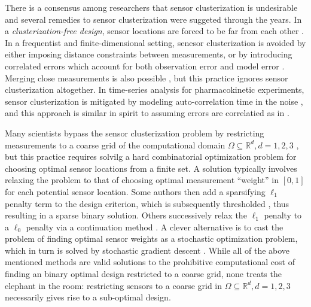There is a consensus among researchers that sensor clusterization is
undesirable \cite{fedorov1996, hooker2009, fedorov2012, Ucinski05,
  neitzel2019sparse} and several remedies to sensor clusterization
were suggeted through the years. In a \emph{clusterization-free
design}, sensor locations are forced to be far from each other
\cite{Ucinski05}. In a frequentist and finite-dimensional setting,
senesor clusterization is avoided by either imposing distance
constraints between measurements, or by introducing correlated errors
which account for both observation error and model error
\cite{Ucinski05}. Merging close measurements is also possible
\cite{fedorov2012}, but this practice ignores sensor clusterization
altogether. In time-series analysis for pharmacokinetic experiments,
sensor clusterization is mitigated by modeling auto-correlation time
in the noise \cite{hooker2009}, and this approach is similar in spirit
to assuming errors are correlatied as in \cite{Ucinski05}.


Many scientists bypass the sensor clusterization problem by
restricting measurements to a coarse grid of the computational domain
$\Omega \subseteq \mathbb{R}^d, d=1,2,3$ \cite{koval2020,
  alexanderian2021, attia2020, alexanderian2014sparsification,
  AlexanderianPetraStadlerEtAl16, alexanderian2018efficient}, but this
practice requires solvilg a hard combinatorial optimization problem
for choosing optimal sensor locations from a finite set. A solution
typically involves relaxing the problem to that of choosing optimal
measurement ``weight'' in $[0,1]$ for each potential sensor
location. Some authors then add a sparsifying $\ell_1$ penalty term to
the design criterion, which is subsequently thresholded
\cite{horesh2008borehole}, thus resulting in a sparse binary
solution. Others successively relax the $\ell_1$ penalty to a $\ell_0$
penalty via a continuation method
\cite{AlexanderianPetraStadlerEtAl16,
  alexanderian2014sparsification}. A clever alternative is to cast the
problem of finding optimal sensor weights as a stochastic optimization
problem, which in turn is solved by stochastic gradient descent
\cite{attia2022stochastic}. While all of the above mentioned methods
are valid solutions to the prohibitive computational cost of finding
an binary optimal design restricted to a coarse grid, none treats the
elephant in the room: restricting sensors to a coarse grid in $\Omega
\subseteq \mathbb{R}^d, d=1,2,3$ necessarily gives rise to a
sub-optimal design.

